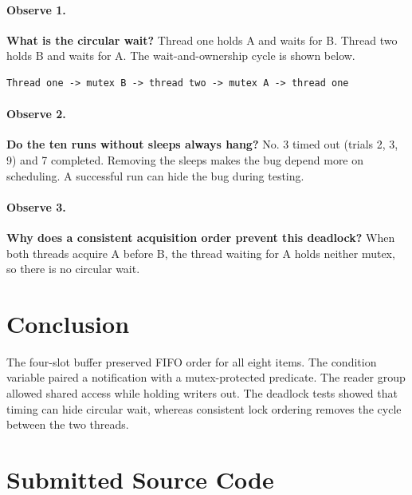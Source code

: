 \documentclass[12pt,a4paper]{article}
\begin{document}
\paragraph{Observe 1.} \textbf{What is the circular wait?} Thread one holds A and waits for B. Thread two holds B and waits for A. The wait-and-ownership cycle is shown below.

\begin{lstlisting}[caption={Wait-and-ownership cycle}]
Thread one -> mutex B -> thread two -> mutex A -> thread one
\end{lstlisting}

\paragraph{Observe 2.} \textbf{Do the ten runs without sleeps always hang?} No. 3 timed out (trials 2, 3, 9) and 7 completed. Removing the sleeps makes the bug depend more on scheduling. A successful run can hide the bug during testing.

\paragraph{Observe 3.} \textbf{Why does a consistent acquisition order prevent this deadlock?} When both threads acquire A before B, the thread waiting for A holds neither mutex, so there is no circular wait.

\section{Conclusion}
The four-slot buffer preserved FIFO order for all eight items. The condition
variable paired a notification with a mutex-protected predicate. The reader
group allowed shared access while holding writers out. The deadlock tests
showed that timing can hide circular wait, whereas consistent lock ordering
removes the cycle between the two threads.

\appendix
\section{Submitted Source Code}
\end{document}
